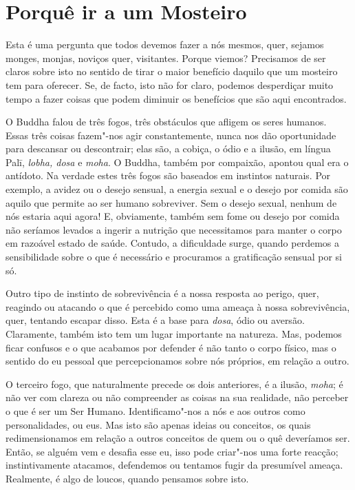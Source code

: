 \chapter{Porquê ir a um Mosteiro}

Esta é uma pergunta que todos devemos fazer a nós mesmos, quer, sejamos
monges, monjas, noviços quer, visitantes. Porque viemos? Precisamos de
ser claros sobre isto no sentido de tirar o maior benefício daquilo que
um mosteiro tem para oferecer. Se, de facto, isto não for claro, podemos
desperdiçar muito tempo a fazer coisas que podem diminuir os benefícios
que são aqui encontrados.

O Buddha falou de três fogos, três obstáculos que afligem os seres
humanos. Essas três coisas fazem"-nos agir constantemente, nunca nos dão
oportunidade para descansar ou descontrair; elas são, a cobiça, o ódio e
a ilusão, em língua Palī, \emph{lobha, dosa} e \emph{moha}. O Buddha,
também por compaixão, apontou qual era o antídoto. Na verdade estes três
fogos são baseados em instintos naturais. Por exemplo, a avidez ou o
desejo sensual, a energia sexual e o desejo por comida são aquilo que
permite ao ser humano sobreviver. Sem o desejo sexual, nenhum de nós
estaria aqui agora! E, obviamente, também sem fome ou desejo por comida
não seríamos levados a ingerir a nutrição que necessitamos para manter o
corpo em razoável estado de saúde. Contudo, a dificuldade surge, quando
perdemos a sensibilidade sobre o que é necessário e procuramos a
gratificação sensual por si só.

Outro tipo de instinto de sobrevivência é a nossa resposta ao perigo,
quer, reagindo ou atacando o que é percebido como uma ameaça à nossa
sobrevivência, quer, tentando escapar disso. Esta é a base para
\emph{dosa}, ódio ou aversão. Claramente, também isto tem um lugar
importante na natureza. Mas, podemos ficar confusos e o que acabamos por
defender é não tanto o corpo físico, mas o sentido do eu pessoal que
percepcionamos sobre nós próprios, em relação a outro.

O terceiro fogo, que naturalmente precede os dois anteriores, é a
ilusão, \emph{moha}; é não ver com clareza ou não compreender as coisas
na sua realidade, não perceber o que é ser um Ser Humano.
Identificamo"-nos a nós e aos outros como personalidades, ou eus. Mas
isto são apenas ideias ou conceitos, os quais redimensionamos em relação
a outros conceitos de quem ou o quê deveríamos ser. Então, se alguém vem
e desafia esse eu, isso pode criar"-nos uma forte reacção;
instintivamente atacamos, defendemos ou tentamos fugir da presumível
ameaça. Realmente, é algo de loucos, quando pensamos sobre isto.

